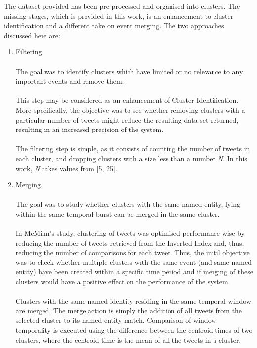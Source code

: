 \documentclass[a4paper,portrait,12pt]{article}
\begin{document}
The dataset provided has been pre-processed and organised into clusters.
The missing stages, which is provided in this work, is an enhancement to cluster identification and a different take on event merging.
The two approaches discussed here are:
\begin{enumerate}
	\item Filtering.\\
	      \\
	      The goal was to identify clusters which have limited or no relevance to any important events and remove them.\\
	      \\
	      This step may be considered as an enhancement of Cluster Identification.
	      More specifically, the objective was to see whether removing clusters with a particular number of tweets might reduce the resulting data set returned, resulting in an increased precision of the system. \\
	      \\
	      The filtering step is simple, as it consists of counting the number of tweets in each cluster, and dropping clusters with a size less than a number \textit{N}.
	      In this work, \textit{N} takes values from [5, 25].
	\item Merging. \\
	      \\
	      The goal was to study whether clusters with the same named entity, lying within the same temporal burst can be merged in the same cluster. \\
	      \\
		  In McMinn's study, clustering of tweets was optimised performance wise by reducing the number of tweets retrieved from the Inverted Index and, thus, reducing the number of comparisons for each tweet.
	      Thus, the initil objective was to check whether multiple clusters with the same event (and same named entity) have been created within a specific time period and if merging of these clusters would have a positive effect on the performance of the system.\\
	      \\
	      Clusters with the same named identity residing in the same temporal window are merged.
	      The merge action is simply the addition of all tweets from the selected cluster to its named entity match.
	      Comparison of window temporality is executed using the difference between the centroid times of two clusters, where the centroid time is the mean of all the tweets in a cluster.\\


\end{enumerate}
\end{document}
